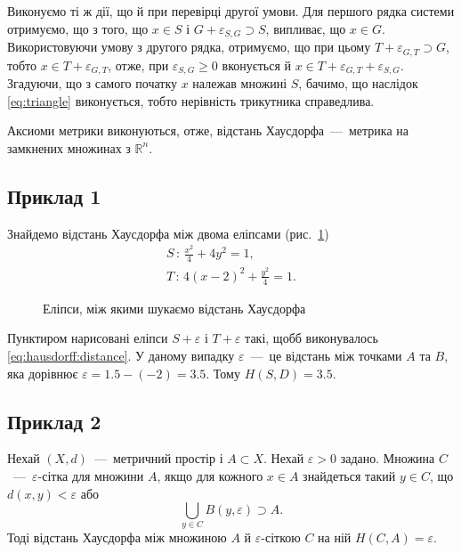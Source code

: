 \begin{enumerate}
  Виконуємо ті ж дії, що й при перевірці другої умови.
  Для першого рядка системи отримуємо, що з того,
  що $x \in S$ і $G + \varepsilon_{S, G} \supset S$, випливає, що $x \in G$.
  Використовуючи умову з другого рядка, отримуємо,
  що при цьому $T + \varepsilon_{G, T} \supset G$,
  тобто $x \in T + \varepsilon_{G, T}$, отже,
  при $ \varepsilon_{S, G} \geq 0$ вконується й
  $x \in T + \varepsilon_{G, T} + \varepsilon_{S, G}$.
  Згадуючи, що з самого початку $x$ належав множині $S$, бачимо,
  що наслідок \eqref{eq:triangle} виконується,
  тобто нерівність трикутника справедлива.
\end{enumerate}
Аксиоми метрики виконуються, отже,
відстань Хаусдорфа~---~метрика на замкнених множинах з $ \mathbb{R}^n$.

\subsection{Приклад 1}

Знайдемо відстань Хаусдорфа між двома еліпсами
(рис.~\ref{fig:hausdorff:example}) \cite{crownover}
\begin{equation*}
  \begin{gathered}
    S \, : \, \frac{x^2}{4} + 4y^2 = 1, \, \\
    T \, : \, 4 \left( x - 2 \right)^2 + \frac{y^2}{4} = 1.
  \end{gathered}
\end{equation*}

\begin{figure}[h]
  \centering
  
  \caption{Еліпси, між якими шукаємо відстань Хаусдорфа}
  \label{fig:hausdorff:example}
\end{figure}

Пунктиром нарисовані еліпси $S + \varepsilon $ і $T + \varepsilon $ такі,
щобб виконувалось \eqref{eq:hausdorff:distance}.
У даному випадку $ \varepsilon $~---~це відстань між точками $A$ та $B$,
яка дорівнює $ \varepsilon = 1.5 - \left( -2 \right) = 3.5$.
Тому $H \left( S, D \right) = 3.5$.

\subsection{Приклад 2}

Нехай $ \left( X, d \right) $~---~метричний простір і $A \subset X$.
Нехай $ \varepsilon > 0$ задано.
Множина $C$~---~$ \varepsilon $-сітка для множини $A$,
якщо для кожного $x \in A$ знайдеться такий $y \in C$,
що $d \left( x, y \right) < \varepsilon $ або
\begin{equation*}
  \bigcup \limits_{y \in C} B \left( y, \varepsilon \right) \supset A.
\end{equation*}
Тоді відстань Хаусдорфа між множиною $A$ й $ \varepsilon $-сіткою $C$ на ній
$H \left( C, A \right) = \varepsilon $.

